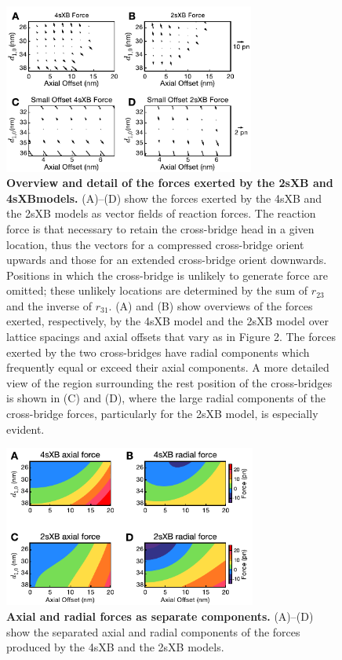 \documentclass[10pt]{article}
\begin{document}
\begin{figure}[!ht]
    \begin{center}
    \includegraphics[width=3.25in]{../imgs/fig_forces.pdf}
    \caption{ \textbf{Overview and detail of the forces exerted by the 2sXB and 4sXB\@ models.}
        (A)--(D) show the forces exerted by the 4sXB and the 2sXB models as vector fields of reaction forces. 
        The reaction force is that necessary to retain the cross-bridge head in a given location, thus the vectors for a compressed cross-bridge orient upwards and those for an extended cross-bridge orient downwards.
        Positions in which the cross-bridge is unlikely to generate force are omitted; these unlikely locations are determined by the sum of $r_{23}$ and the inverse of $r_{31}$. 
        (A) and (B) show overviews of the forces exerted, respectively, by the 4sXB model and the 2sXB model over lattice spacings and axial offsets that vary as in Figure 2. 
        The forces exerted by the two cross-bridges have radial components which frequently equal or exceed their axial components. 
        A more detailed view of the region surrounding the rest position of the cross-bridges is shown in (C) and (D), where the large radial components of the cross-bridge forces, particularly for the 2sXB model, is especially evident.  
        \label{fig_forces}
        }
    \end{center}
\end{figure}

\begin{figure}[!ht]
    \begin{center}
    \includegraphics[width=8.3cm]{../imgs/fig_force_contours.pdf}
    \caption{ \textbf{Axial and radial forces as separate components.}
        (A)--(D) show the separated axial and radial components of the forces produced by the 4sXB and the 2sXB models.
        \label{fig_force_contours}
           }
    \end{center}
\end{figure}
\end{document}

